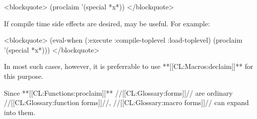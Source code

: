 <blockquote> (proclaim '(special *x*)) </blockquote>

If compile time side effects are desired,  may be useful. For example:

<blockquote> (eval-when (:execute :compile-toplevel :load-toplevel) (proclaim '(special *x*))) </blockquote>

In most such cases, however, it is preferrable to use **[[CL:Macros:declaim]]** for this purpose.

Since **[[CL:Functions:proclaim]]** //[[CL:Glossary:forms]]// are ordinary //[[CL:Glossary:function forms]]//, //[[CL:Glossary:macro forms]]// can expand into them.

  
